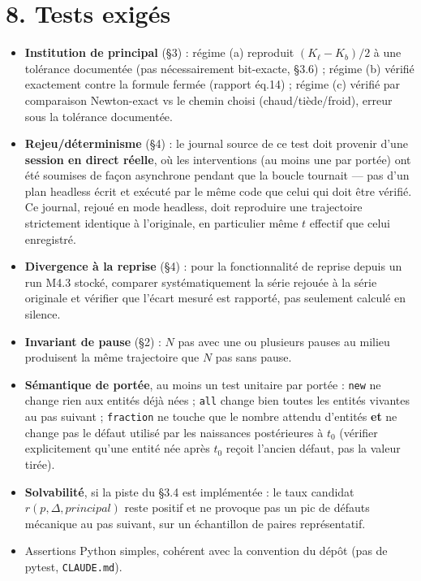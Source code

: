 \documentclass[11pt,a4paper]{article}
\newcommand{\code}[1]{\texttt{#1}}
\begin{document}
\section*{8. Tests exigés}

\begin{itemize}
\item \textbf{Institution de principal} (\S3) : régime (a) reproduit
  $(K_\ell-K_b)/2$ à une tolérance documentée (pas nécessairement
  bit-exacte, \S3.6) ; régime (b) vérifié exactement contre la formule
  fermée (rapport éq.14) ; régime (c) vérifié par comparaison
  Newton-exact vs le chemin choisi (chaud/tiède/froid), erreur sous la
  tolérance documentée.
\item \textbf{Rejeu/déterminisme} (\S4) : le journal source de ce test
  doit provenir d'une \textbf{session en direct réelle}, où les
  interventions (au moins une par portée) ont été soumises de façon
  asynchrone pendant que la boucle tournait --- pas d'un plan headless
  écrit et exécuté par le même code que celui qui doit être vérifié. Ce
  journal, rejoué en mode headless, doit reproduire une trajectoire
  strictement identique à l'originale, en particulier même $t$ effectif
  que celui enregistré.
\item \textbf{Divergence à la reprise} (\S4) : pour la fonctionnalité de
  reprise depuis un run M4.3 stocké, comparer systématiquement la série
  rejouée à la série originale et vérifier que l'écart mesuré est
  rapporté, pas seulement calculé en silence.
\item \textbf{Invariant de pause} (\S2) : $N$ pas avec une ou plusieurs
  pauses au milieu produisent la même trajectoire que $N$ pas sans
  pause.
\item \textbf{Sémantique de portée}, au moins un test unitaire par
  portée : \code{new} ne change rien aux entités déjà nées ; \code{all}
  change bien toutes les entités vivantes au pas suivant ;
  \code{fraction} ne touche que le nombre attendu d'entités \textbf{et}
  ne change pas le défaut utilisé par les naissances postérieures à
  $t_0$ (vérifier explicitement qu'une entité née après $t_0$ reçoit
  l'ancien défaut, pas la valeur tirée).
\item \textbf{Solvabilité}, si la piste du \S3.4 est implémentée : le
  taux candidat $r(p,\Delta,\mathit{principal})$ reste positif et ne
  provoque pas un pic de défauts mécanique au pas suivant, sur un
  échantillon de paires représentatif.
\item Assertions Python simples, cohérent avec la convention du dépôt
  (pas de pytest, \code{CLAUDE.md}).
\end{itemize}
\end{document}
